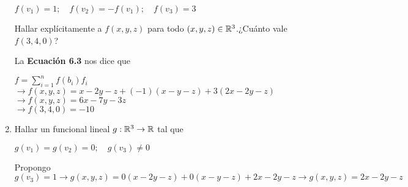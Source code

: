 \begin{enumerate}
\begin{center}
                $f(v_1)=1;\quad f(v_2)=-f(v_1);\quad f(v_3)=3$
            \end{center}
            Hallar explícitamente a $f(x,y,z)$ para todo $(x,y,z)\in\mathbb{R}^3$.¿Cuánto vale $f(3,4,0)$?
            \begin{mdframed}[style=s]
                La \textbf{Ecuación 6.3} nos dice que 
                \begin{center}
                    $f=\sum_{i=1}^n f(b_i)f_i$\\
                    $\to f(x,y,z)=x-2y-z+(-1)(x-y-z)+3(2x-2y-z)$\\
                    $\to f(x,y,z)=6x-7y-3z$\\
                    $\to f(3,4,0)=-10$
                \end{center}
            \end{mdframed}
        \item Hallar un funcional lineal $g:\mathbb{R}^3\to\mathbb{R}$ tal que
            \begin{center}
                $g(v_1)=g(v_2)=0;\quad g(v_3)\neq 0$
            \end{center}
            \begin{mdframed}[style=s]
                Propongo $g(v_3)=1\to g(x,y,z)=0(x-2y-z)+0(x-y-z)+2x-2y-z\to g(x,y,z)=2x-2y-z$
            \end{mdframed}
    \end{enumerate}